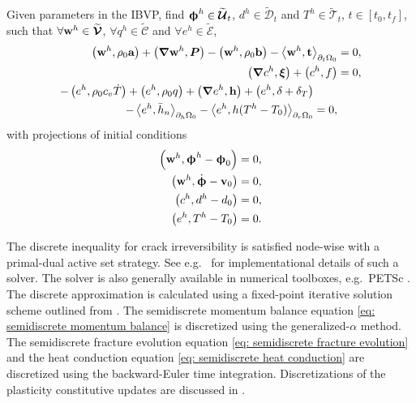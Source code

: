 \begin{mdframed}[
    frametitle={The semidiscrete Galerkin form},
    frametitlebackgroundcolor=gray!20,
    backgroundcolor=gray!5,
    linewidth=0pt,
    nobreak=true
  ]
  Given parameters in the IBVP, find $\boldsymbol{\upphi}^h \in \widetilde{\boldsymbol{\mathcal{U}}}_t$, $d^h \in \widetilde{\mathcal{D}}_t$ and $T^h \in \widetilde{\mathcal{T}}_t$, $t \in [t_0, t_f]$, such that $\forall \textbf{w}^h \in \widetilde{\boldsymbol{\mathcal{V}}}$, $\forall q^h \in \widetilde{\mathcal{C}}$ and $\forall e^h \in \widetilde{\mathcal{E}}$,
  \begin{subequations}
    \begin{align}
      \left( \textbf{w}^h, \rho_0\textbf{a} \right) + \left( \boldsymbol{\nabla} \textbf{w}^h, \boldsymbol{P} \right) - \left( \textbf{w}^h, \rho_0 \textbf{b} \right) - \left< \textbf{w}^h, \textbf{t} \right>_{\partial_t\Omega_0} & = 0, \label{eq: semidiscrete momentum balance}   \\
      \left( \boldsymbol{\nabla} c^h, \boldsymbol{\xi} \right) + \left( c^h, f \right)                                                                                                   & = 0, \label{eq: semidiscrete fracture evolution} \\
      \begin{split}
        - \left( e^h, \rho_0c_v\dot{T} \right) + \left( e^h, \rho_0q \right) + \left( \boldsymbol{\nabla} e^h, \textbf{h} \right) + \left( e^h, \delta+\delta_T \right)& \\
        - \left< e^h, \bar{h}_n \right>_{\partial_h\Omega_0} - \left< e^h, h(T^h-T_0) \right>_{\partial_r\Omega_0} &= 0,
      \end{split} \label{eq: semidiscrete heat conduction}
    \end{align}
  \end{subequations}
  with projections of initial conditions
  \begin{subequations}
    \begin{align}
      \left( \textbf{w}^h, \boldsymbol{\upphi}^h - \boldsymbol{\upphi}_0 \right) & = 0, \\
      \left( \textbf{w}^h, \dot{\boldsymbol{\upphi}} - \textbf{v}_0 \right)             & = 0, \\
      \left( c^h, d^h - d_0 \right)                        & = 0, \\
      \left( e^h, T^h - T_0 \right)                        & = 0. 
    \end{align}
  \end{subequations}
\end{mdframed}
The discrete inequality for crack irreversibility is satisfied node-wise with a primal-dual active set strategy. See e.g.\  \citet{heister2015primal} for implementational details of such a solver. The solver is also generally available in numerical toolboxes, e.g.\  PETSc \cite{petsc-web-page}. The discrete approximation is calculated using a fixed-point iterative solution scheme outlined from \cite{HuGary2020}. The semidiscrete momentum balance equation \eqref{eq: semidiscrete momentum balance} is discretized using the generalized-$\alpha$ method. The semidiscrete fracture evolution equation \eqref{eq: semidiscrete fracture evolution} and the heat conduction equation \eqref{eq: semidiscrete heat conduction} are discretized using the backward-Euler time integration. Discretizations of the plasticity constitutive updates are discussed in .
